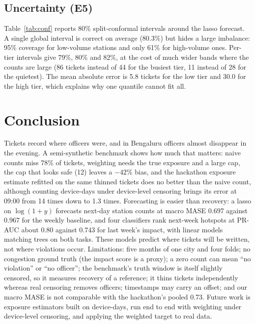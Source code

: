 \documentclass[conference]{IEEEtran}
\newcommand{\tab}[1]{}
\begin{document}
\subsection{Uncertainty (E5)}
Table~\ref{tab:conf} reports 80\% split-conformal intervals around the lasso forecast. A single global interval is correct on average (80.3\%) but hides a large imbalance: 95\% coverage for low-volume stations and only 61\% for high-volume ones. Per-tier intervals give 79\%, 80\% and 82\%, at the cost of much wider bands where the counts are large (86 tickets instead of 44 for the busiest tier, 11 instead of 28 for the quietest). The mean absolute error is 5.8 tickets for the low tier and 30.0 for the high tier, which explains why one quantile cannot fit all.

\begin{table}[t]
\centering
\caption{80\% conformal intervals for next-day counts: coverage (\%) / mean width (tickets) by station-volume tier; target coverage 80\%.}
\label{tab:conf}
\footnotesize\setlength{\tabcolsep}{2.5pt}
\tab{conf}
\end{table}

\section{Conclusion}
Tickets record where officers were, and in Bengaluru officers almost disappear in the evening. A semi-synthetic benchmark shows how much that matters: naive counts miss 78\% of tickets, weighting needs the true exposure and a large cap, the cap that looks safe (12) leaves a \(-42\%\) bias, and the hackathon exposure estimate refitted on the same thinned tickets does no better than the naive count, although counting device-days under device-level censoring brings its error at 09:00 from 14 times down to 1.3 times. Forecasting is easier than recovery: a lasso on \(\log(1{+}y)\) forecasts next-day station counts at macro MASE 0.697 against 0.967 for the weekly baseline, and four classifiers rank next-week hotspots at PR-AUC about 0.80 against 0.743 for last week's impact, with linear models matching trees on both tasks. These models predict where tickets will be written, not where violations occur. Limitations: five months of one city and four folds; no congestion ground truth (the impact score is a proxy); a zero count can mean ``no violation'' or ``no officer''; the benchmark's truth window is itself slightly censored, so it measures recovery of a reference; it thins tickets independently whereas real censoring removes officers; timestamps may carry an offset; and our macro MASE is not comparable with the hackathon's pooled 0.73. Future work is exposure estimators built on device-days, run end to end with weighting under device-level censoring, and applying the weighted target to real data.
\end{document}
